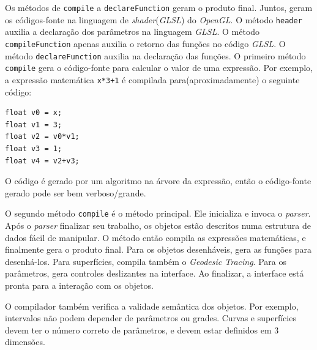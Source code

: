 Os métodos de \texttt{compile} a \texttt{declareFunction} geram o produto final.
Juntos, geram os códigos-fonte na linguagem de \textit{shader}(\textit{GLSL}) do \textit{OpenGL}.
O método \texttt{header} auxilia a declaração dos parâmetros na linguagem \textit{GLSL}.
O método \texttt{compileFunction} apenas auxilia o retorno das funções no código \textit{GLSL}.
O método \texttt{declareFunction} auxilia na declaração das funções.
O primeiro método \texttt{compile} gera o código-fonte para calcular o valor de uma
expressão.
Por exemplo, a expressão matemática \texttt{x*3+1} é
compilada para(aproximadamente) o seguinte código:

\begin{lstlisting}
float v0 = x;
float v1 = 3;
float v2 = v0*v1;
float v3 = 1;
float v4 = v2+v3;
\end{lstlisting}

O código é gerado por um algoritmo na árvore da expressão,
então o código-fonte gerado pode ser bem verboso/grande.

O segundo método \texttt{compile} é o método principal.
Ele inicializa e invoca o \textit{parser}.
Após o \textit{parser} finalizar seu trabalho, os objetos estão descritos
numa estrutura de dados fácil de manipular.
O método então compila as expressões matemáticas, e finalmente gera o produto final.
Para os objetos desenháveis, gera as funções para desenhá-los.
Para superfícies, compila também o \textit{Geodesic Tracing}.
Para os parâmetros, gera controles deslizantes na interface.
Ao finalizar, a interface está pronta para a interação com os objetos.

O compilador também verifica a validade semântica dos objetos.
Por exemplo, intervalos não podem depender de parâmetros ou grades.
Curvas e superfícies devem ter o número correto de parâmetros, e devem estar
definidos em 3 dimensões.